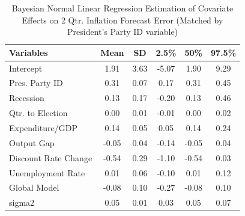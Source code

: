 \documentclass[a4paper]{article}\usepackage{graphicx, color}
\begin{document}

\begin{table}[ht]
\centering
\caption{Bayesian Normal Linear Regression Estimation of Covariate Effects on 2 Qtr. Inflation Forecast Error (Matched by President's Party ID variable)} 
\label{OutputPB}
{\small
\begin{tabular}{lccccc}
  \hline
Variables & Mean & SD & 2.5\% & 50\% & 97.5\% \\ 
  \hline
Intercept & 1.91 & 3.63 & -5.07 & 1.90 & 9.29 \\ 
  Pres. Party ID & 0.31 & 0.07 & 0.17 & 0.31 & 0.45 \\ 
  Recession & 0.13 & 0.17 & -0.20 & 0.13 & 0.46 \\ 
  Qtr. to Election & 0.00 & 0.01 & -0.01 & 0.00 & 0.02 \\ 
  Expenditure/GDP & 0.14 & 0.05 & 0.05 & 0.14 & 0.24 \\ 
  Output Gap & -0.05 & 0.04 & -0.14 & -0.05 & 0.04 \\ 
  Discount Rate Change & -0.54 & 0.29 & -1.10 & -0.54 & 0.03 \\ 
  Unemployment Rate & 0.01 & 0.06 & -0.10 & 0.01 & 0.12 \\ 
  Global Model & -0.08 & 0.10 & -0.27 & -0.08 & 0.10 \\ 
  sigma2 & 0.05 & 0.01 & 0.03 & 0.05 & 0.07 \\ 
   \hline
\end{tabular}
}
\end{table}



\end{document}
